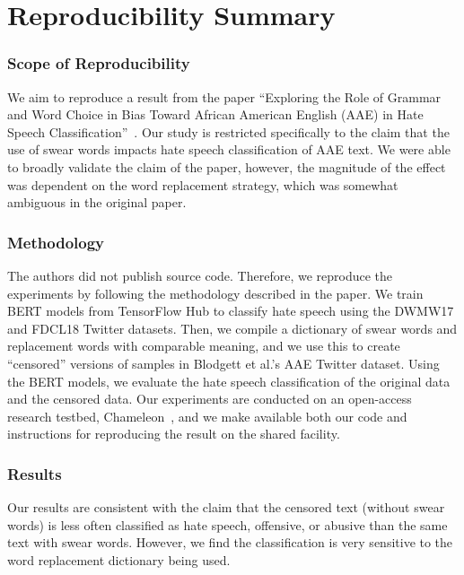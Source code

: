\section*{\centering Reproducibility Summary}


\subsubsection*{Scope of Reproducibility}
We aim to reproduce a result from the paper ``Exploring the Role of Grammar and Word Choice in
Bias Toward African American English (AAE) in Hate
Speech Classification''~\cite{aae_paper}. Our study is restricted specifically to the claim that the use of swear words impacts hate speech classification of AAE text. We were able to broadly validate the claim of the paper, however, the magnitude of the effect was dependent on the word replacement strategy, which was somewhat ambiguous in the original paper.

\subsubsection*{Methodology}
The authors did not publish source code. Therefore, we reproduce the experiments by following the methodology described in the paper. We train BERT models from TensorFlow Hub \cite{bert} to classify hate speech using the DWMW17\cite{davidson} and FDCL18\cite{founta} Twitter datasets. Then, we compile a dictionary of swear words and replacement words with comparable meaning, and we use this to create ``censored'' versions of samples in Blodgett et al.’s\cite{blodgett} AAE Twitter dataset. Using the BERT models, we evaluate the hate speech classification of the original data and the censored data.  Our experiments are conducted on an open-access research testbed, Chameleon~\cite{chameleon}, and we make available both our code and instructions for reproducing the result on the shared facility.

\subsubsection*{Results}
Our results are consistent with the claim that the censored text (without swear words) is less often classified as hate speech, offensive, or abusive than the same text with swear words. However, we find the classification is very sensitive to the word replacement dictionary being used.

